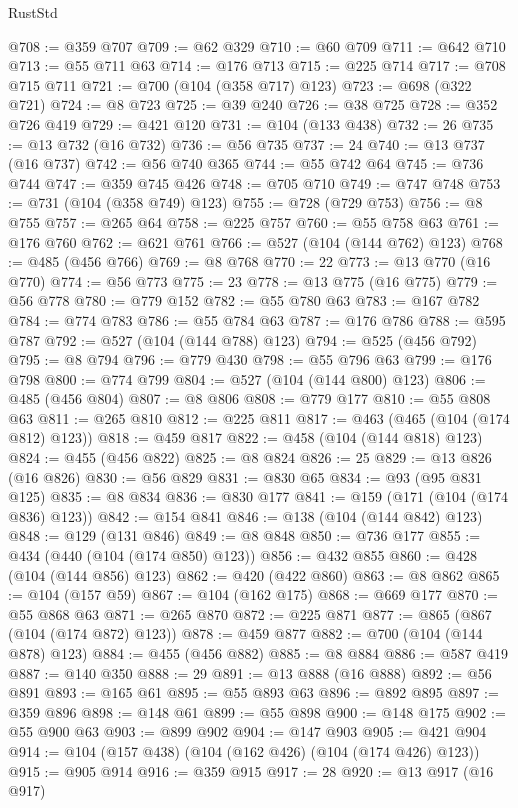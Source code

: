 \begin{lexlean}{RustStd}
\begin{coremodule}
{\begin{coremodule}
{{{{{{{{{{{{{{{{{{{{{{{{{{{{{{{{{{{@708 := @359 @707
@709 := @62 @329
@710 := @60 @709
@711 := @642 @710
@713 := @55 @711 @63
@714 := @176 @713
@715 := @225 @714
@717 := @708 @715 @711
@721 := @700 (@104 (@358 @717) @123)
@723 := @698 (@322 @721)
@724 := @8 @723
@725 := @39 @240
@726 := @38 @725
@728 := @352 @726 @419
@729 := @421 @120
@731 := @104 (@133 @438)
@732 := 26
@735 := @13 @732 (@16 @732)
@736 := @56 @735
@737 := 24
@740 := @13 @737 (@16 @737)
@742 := @56 @740 @365
@744 := @55 @742 @64
@745 := @736 @744
@747 := @359 @745 @426
@748 := @705 @710
@749 := @747 @748
@753 := @731 (@104 (@358 @749) @123)
@755 := @728 (@729 @753)
@756 := @8 @755
@757 := @265 @64
@758 := @225 @757
@760 := @55 @758 @63
@761 := @176 @760
@762 := @621 @761
@766 := @527 (@104 (@144 @762) @123)
@768 := @485 (@456 @766)
@769 := @8 @768
@770 := 22
@773 := @13 @770 (@16 @770)
@774 := @56 @773
@775 := 23
@778 := @13 @775 (@16 @775)
@779 := @56 @778
@780 := @779 @152
@782 := @55 @780 @63
@783 := @167 @782
@784 := @774 @783
@786 := @55 @784 @63
@787 := @176 @786
@788 := @595 @787
@792 := @527 (@104 (@144 @788) @123)
@794 := @525 (@456 @792)
@795 := @8 @794
@796 := @779 @430
@798 := @55 @796 @63
@799 := @176 @798
@800 := @774 @799
@804 := @527 (@104 (@144 @800) @123)
@806 := @485 (@456 @804)
@807 := @8 @806
@808 := @779 @177
@810 := @55 @808 @63
@811 := @265 @810
@812 := @225 @811
@817 := @463 (@465 (@104 (@174 @812) @123))
@818 := @459 @817
@822 := @458 (@104 (@144 @818) @123)
@824 := @455 (@456 @822)
@825 := @8 @824
@826 := 25
@829 := @13 @826 (@16 @826)
@830 := @56 @829
@831 := @830 @65
@834 := @93 (@95 @831 @125)
@835 := @8 @834
@836 := @830 @177
@841 := @159 (@171 (@104 (@174 @836) @123))
@842 := @154 @841
@846 := @138 (@104 (@144 @842) @123)
@848 := @129 (@131 @846)
@849 := @8 @848
@850 := @736 @177
@855 := @434 (@440 (@104 (@174 @850) @123))
@856 := @432 @855
@860 := @428 (@104 (@144 @856) @123)
@862 := @420 (@422 @860)
@863 := @8 @862
@865 := @104 (@157 @59)
@867 := @104 (@162 @175)
@868 := @669 @177
@870 := @55 @868 @63
@871 := @265 @870
@872 := @225 @871
@877 := @865 (@867 (@104 (@174 @872) @123))
@878 := @459 @877
@882 := @700 (@104 (@144 @878) @123)
@884 := @455 (@456 @882)
@885 := @8 @884
@886 := @587 @419
@887 := @140 @350
@888 := 29
@891 := @13 @888 (@16 @888)
@892 := @56 @891
@893 := @165 @61
@895 := @55 @893 @63
@896 := @892 @895
@897 := @359 @896
@898 := @148 @61
@899 := @55 @898
@900 := @148 @175
@902 := @55 @900 @63
@903 := @899 @902
@904 := @147 @903
@905 := @421 @904
@914 := @104 (@157 @438) (@104 (@162 @426) (@104 (@174 @426) @123))
@915 := @905 @914
@916 := @359 @915
@917 := 28
@920 := @13 @917 (@16 @917)
}}}}}}}}}}}}}}}}}}}}}}}}}}}}}}}}}}}
\end{coremodule}}
\end{coremodule}
\end{lexlean}
